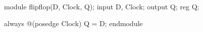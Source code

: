 \begin{frame}[fragile]
	\frametitle{}
	\begin{verilogcode}
module flipflop(D, Clock, Q); 
  input D, Clock;
  output Q;
  reg Q;

  always @(posedge Clock) 
    Q = D;
endmodule
    \end{verilogcode}
\end{frame}


